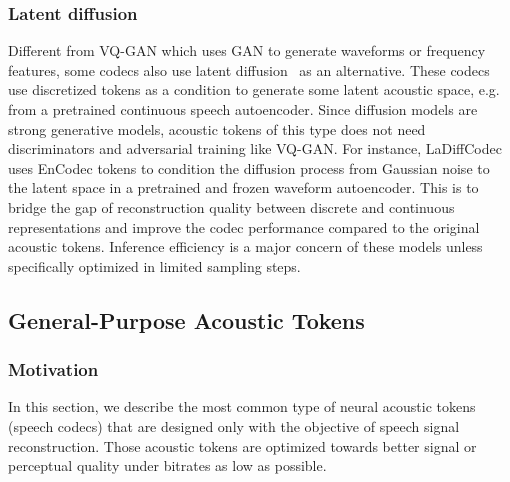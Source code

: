 \subsubsection{Latent diffusion} 
Different from VQ-GAN which uses GAN to generate waveforms or frequency features, some codecs also use latent diffusion~\cite{ho2020denoising,song2021scorebased,rombach2022high} as an alternative.
These codecs use discretized tokens as a condition to generate some latent acoustic space, e.g. from a pretrained continuous speech autoencoder.
Since diffusion models are strong generative models, acoustic tokens of this type does not need discriminators and adversarial training like VQ-GAN.
For instance, LaDiffCodec~\cite{yang2024generative} uses EnCodec tokens to condition the diffusion process from Gaussian noise to the latent space in a pretrained and frozen waveform autoencoder.
This is to bridge the gap of reconstruction quality between discrete and continuous representations and improve the codec performance compared to the original acoustic tokens.
Inference efficiency is a major concern of these models unless specifically optimized in limited sampling steps.


\vspace{-0.1in}
\subsection{General-Purpose Acoustic Tokens}

\label{sec:acoustic-general}

\subsubsection{Motivation}

In this section, we describe the most common type of neural acoustic tokens (speech codecs) that are designed only with the objective of speech signal reconstruction.
Those acoustic tokens are optimized towards better signal or perceptual quality under bitrates as low as possible. 

